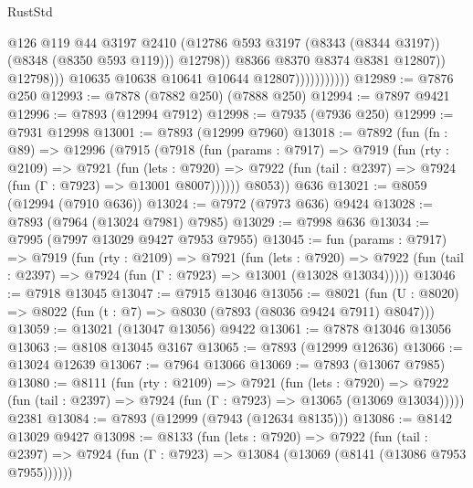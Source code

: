 \begin{lexlean}{RustStd}
\begin{coremodule}
{\begin{coremodule}
{{{{{{{{{{{{{{{{{{{{{{{{{{{{{{{{{{{{{{{{{{{{{{{{{{                                        @126
                                        @119
                                        @44
                                        @3197
                                        @2410
                                        (@12786
                                          @593
                                          @3197
                                          (@8343 (@8344 @3197))
                                          (@8348 (@8350 @593 @119)))
                                        @12798))
                                    @8366
                                    @8370
                                    @8374
                                    @8381
                                    @12807))
                                @12798)))
                          @10635
                          @10638
                          @10641
                          @10644
                          @12807)))))))))))
@12989 := @7876 @250
@12993 := @7878 (@7882 @250) (@7888 @250)
@12994 := @7897 @9421
@12996 := @7893 (@12994 @7912)
@12998 := @7935 (@7936 @250)
@12999 := @7931 @12998
@13001 := @7893 (@12999 @7960)
@13018 := @7892
    (fun (fn : @89) =>
    @12996
      (@7915
        (@7918
          (fun (params : @7917) =>
          @7919
            (fun (rty : @2109) =>
            @7921
              (fun (lets : @7920) =>
              @7922 (fun (tail : @2397) => @7924 (fun (Γ : @7923) => @13001 @8007))))))
        @8053))
    @636
@13021 := @8059 (@12994 (@7910 @636))
@13024 := @7972 (@7973 @636) @9424
@13028 := @7893 (@7964 (@13024 @7981) @7985)
@13029 := @7998 @636
@13034 := @7995 (@7997 @13029 @9427 @7953 @7955)
@13045 := fun (params : @7917) =>
  @7919
    (fun (rty : @2109) =>
    @7921
      (fun (lets : @7920) =>
      @7922 (fun (tail : @2397) => @7924 (fun (Γ : @7923) => @13001 (@13028 @13034)))))
@13046 := @7918 @13045
@13047 := @7915 @13046
@13056 := @8021 (fun (U : @8020) => @8022 (fun (t : @7) => @8030 (@7893 (@8036 @9424 @7911) @8047)))
@13059 := @13021 (@13047 @13056) @9422
@13061 := @7878 @13046 @13056
@13063 := @8108 @13045 @3167
@13065 := @7893 (@12999 @12636)
@13066 := @13024 @12639
@13067 := @7964 @13066
@13069 := @7893 (@13067 @7985)
@13080 := @8111
    (fun (rty : @2109) =>
    @7921
      (fun (lets : @7920) =>
      @7922 (fun (tail : @2397) => @7924 (fun (Γ : @7923) => @13065 (@13069 @13034)))))
    @2381
@13084 := @7893 (@12999 (@7943 (@12634 @8135)))
@13086 := @8142 @13029 @9427
@13098 := @8133
    (fun (lets : @7920) =>
    @7922
      (fun (tail : @2397) =>
      @7924 (fun (Γ : @7923) => @13084 (@13069 (@8141 (@13086 @7953 @7955))))))
}}}}}}}}}}}}}}}}}}}}}}}}}}}}}}}}}}}}}}}}}}}}}}}}}}
\end{coremodule}}
\end{coremodule}
\end{lexlean}
